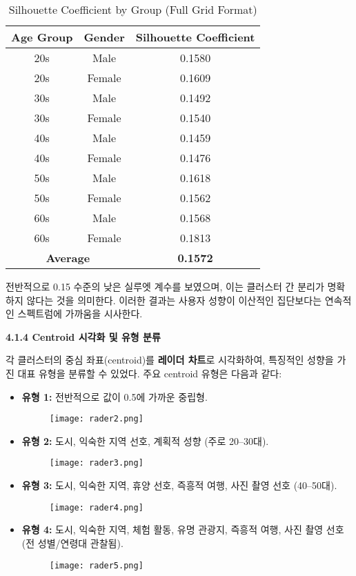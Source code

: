 \documentclass[sigconf]{acmart}
\begin{document}
\begin{CJK}{UTF8}{mj}
\begin{table}[H]
\centering
\caption{Silhouette Coefficient by Group (Full Grid Format)}
\begin{tabular}{|c|c|c|}
\hline
\textbf{Age Group} & \textbf{Gender} & \textbf{Silhouette Coefficient} \\
\hline
20s & Male   & 0.1580 \\
20s & Female & 0.1609 \\
30s & Male   & 0.1492 \\
30s & Female & 0.1540 \\
40s & Male   & 0.1459 \\
40s & Female & 0.1476 \\
50s & Male   & 0.1618 \\
50s & Female & 0.1562 \\
60s & Male   & 0.1568 \\
60s & Female & 0.1813 \\
\hline
\multicolumn{2}{|c|}{\textbf{Average}} & \textbf{0.1572} \\
\hline
\end{tabular}
\end{table}


전반적으로 0.15 수준의 낮은 실루엣 계수를 보였으며, 이는 클러스터 간 분리가 명확하지 않다는 것을 의미한다. 이러한 결과는 사용자 성향이 이산적인 집단보다는 연속적인 스펙트럼에 가까움을 시사한다.

\vspace{0.5em}
\noindent\textbf{4.1.4 Centroid 시각화 및 유형 분류}\par

각 클러스터의 중심 좌표(centroid)를 \textbf{레이더 차트}로 시각화하여, 특징적인 성향을 가진 대표 유형을 분류할 수 있었다. 주요 centroid 유형은 다음과 같다:

\begin{itemize}
  \item \textbf{유형 1:} 전반적으로 값이 0.5에 가까운 중립형.
    \begin{figure}[H]
    \centering
    \texttt{[image: rader2.png]}
    \label{fig:pca_all}
    \end{figure}
  \item \textbf{유형 2:} 도시, 익숙한 지역 선호, 계획적 성향 (주로 20–30대).
    \begin{figure}[H]
    \centering
    \texttt{[image: rader3.png]}
    \label{fig:pca_all}
    \end{figure}
  \item \textbf{유형 3:} 도시, 익숙한 지역, 휴양 선호, 즉흥적 여행, 사진 촬영 선호 (40–50대).
    \begin{figure}[H]
    \centering
    \texttt{[image: rader4.png]}
    \label{fig:pca_all}
    \end{figure}
  \item \textbf{유형 4:} 도시, 익숙한 지역, 체험 활동, 유명 관광지, 즉흥적 여행, 사진 촬영 선호 (전 성별/연령대 관찰됨).
    \begin{figure}[H]
    \centering
    \texttt{[image: rader5.png]}
    \label{fig:pca_all}
    \end{figure}
\end{itemize}


\end{CJK}
\end{document}
